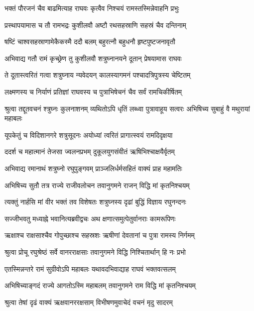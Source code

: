 \twolineshloka
{भक्तं पौरजनं चैव बाढमित्याह राघवः}
{कृत्वैव निश्चयं रामस्तस्मिन्नेवाहनि प्रभुः} %

\twolineshloka
{प्रस्थापयामास च तौ रामभद्रः कुशीलवौ}
{अष्टौ रथसहस्राणि सहस्रं चैव दन्तिनाम्} %

\twolineshloka
{षष्टिं चाश्वसहस्राणामेकैकस्मै ददौ बलम्}
{बहुरत्नौ बहुधनौ हृष्टपुष्टजनावृतौ} %

\twolineshloka
{अभिवाद्य गतौ रामं कृच्छ्रेण तु कुशीलवौ}
{शत्रुघ्नानयने दूतान् प्रेषयामास राघवः} %

\twolineshloka
{ते दूतास्त्वरितं गत्वा शत्रुघ्नाय न्यवेदयन्}
{कालस्यागमनं पश्चादत्रिपुत्रस्य चेष्टितम्} %

\twolineshloka
{लक्ष्मणस्य च निर्याणं प्रतिज्ञां राघवस्य च}
{पुत्राभिषेचनं चैव सर्वं रामचिकीर्षितम्} %

\threelineshloka
{श्रुत्वा तद्दूतवचनं श्त्रुघ्नः कुलनाशनम्}
{व्यथितोऽपि धृतिं लब्ध्वा पुत्रावाहूय सत्वरः}
{अभिषिच्य सुबाहुं वै मथुरायां महाबलः} %

\twolineshloka
{यूपकेतुं च विदिशानगरे शत्रुसूदनः}
{अयोध्यां त्वरितं प्रागात्स्वयं रामदिदृक्षया} %

\twolineshloka
{ददर्श च महात्मानं तेजसा ज्वलनप्रभम्}
{दुकूलयुगसंवीतं ऋषिभिश्चाक्षयैर्वृतम्} %

\twolineshloka
{अभिवाद्य रमानाथं शत्रुघ्नो रघुपुङ्गवम्}
{प्राञ्जलिर्धर्मसहितं वाक्यं प्राह महामतिः} %

\twolineshloka
{अभिषिच्य सुतौ तत्र राज्ये राजीवलोचन}
{तवानुगमने राजन् विद्धि मां कृतनिश्चयम्} %

\twolineshloka
{त्यक्तुं नार्हसि मां वीर भक्तं तव विशेषतः}
{शत्रुघ्नस्य दृढां बुद्धिं विज्ञाय रघुनन्दनः} %

\twolineshloka
{सज्जीभवतु मध्याह्ने भवानित्यब्रवीद्वचः}
{अथ क्षणात्समुत्पेतुर्वानराः कामरूपिणः} %

\twolineshloka
{ऋक्षाश्च राक्षसाश्चैव गोपुच्छाश्च सहस्रशः}
{ऋषीणां देवतानां च पुत्रा रामस्य निर्गमम्} %

\twolineshloka
{श्रुत्वा प्रोचू रघुश्रेष्ठं सर्वे वानरराक्षसाः}
{तवानुगमने विद्धि निश्चितार्थान् हि नः प्रभो} %

\twolineshloka
{एतस्मिन्नन्तरे रामं सुग्रीवोऽपि महाबलः}
{यथावदभिवाद्याह राघवं भक्तवत्सलम्} %

\twolineshloka
{अभिषिच्याङ्गदं राज्ये आगतोऽस्मि महाबलम्}
{तवानुगमने राम विद्धि मां कृतनिश्चयम्} %

\twolineshloka
{श्रुत्वा तेषां दृढं वाक्यं ऋक्षवानररक्षसाम्}
{विभीषणमुवाचेदं वचनं मृदु सादरम्} %


